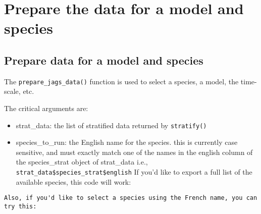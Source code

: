 \documentclass[
]{book}
\newenvironment{Shaded}{\begin{snugshade}}{\end{snugshade}}
\newcommand{\CommentTok}[1]{\textcolor[rgb]{0.56,0.35,0.01}{\textit{#1}}}
\newcommand{\FunctionTok}[1]{\textcolor[rgb]{0.00,0.00,0.00}{#1}}
\newcommand{\NormalTok}[1]{#1}
\newcommand{\OtherTok}[1]{\textcolor[rgb]{0.56,0.35,0.01}{#1}}
\newcommand{\SpecialCharTok}[1]{\textcolor[rgb]{0.00,0.00,0.00}{#1}}
\newcommand{\StringTok}[1]{\textcolor[rgb]{0.31,0.60,0.02}{#1}}
\providecommand{\tightlist}{%
  \setlength{\itemsep}{0pt}\setlength{\parskip}{0pt}}
\begin{document}
\hypertarget{DataPrep}{%
\chapter{Prepare the data for a model and species}\label{DataPrep}}

\hypertarget{prepare-data-for-a-model-and-species}{%
\section{Prepare data for a model and species}\label{prepare-data-for-a-model-and-species}}

The \texttt{prepare\_jags\_data()} function is used to select a species, a model, the time-scale, etc.

The critical arguments are:

\begin{itemize}
\tightlist
\item
  strat\_data: the list of stratified data returned by \texttt{stratify()}
\item
  species\_to\_run: the English name for the species. this is currently case sensitive, and must exactly match one of the names in the english column of the species\_strat object of strat\_data i.e., \texttt{strat\_data\$species\_strat\$english}
  If you'd like to export a full list of the available species, this code will work:
\end{itemize}

\begin{Shaded}
\end{Shaded}

\begin{verbatim}
Also, if you'd like to select a species using the French name, you can try this:
\end{verbatim}

\begin{Shaded}
\end{Shaded}
\end{document}

